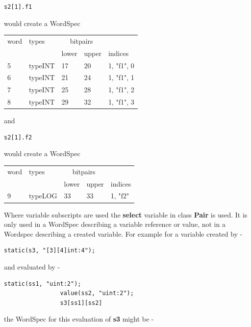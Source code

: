             \begin{lstlisting}[gobble=12, language=threepl]
                s2[1].f1
            \end{lstlisting}
            would create a WordSpec

            \begin{tabular}{| l || l || l l | l |}
            \hline
            word  & types    & \multicolumn{2}{c|}{bitpairs} & \\
                  &          & lower & upper & indices \\
            \hline \hline
             5    & typeINT  & 17    & 20    & 1, "f1", 0  \\ \hline
             6    & typeINT  & 21    & 24    & 1, "f1", 1  \\ \hline
             7    & typeINT  & 25    & 28    & 1, "f1", 2  \\ \hline
             8    & typeINT  & 29    & 32    & 1, "f1", 3  \\ \hline
            \end{tabular}

            and
            \begin{lstlisting}[gobble=12, language=threepl]
                s2[1].f2
            \end{lstlisting}
            would create a WordSpec

            \begin{tabular}{| l || l || l l | l |}
            \hline
            word  & types    & \multicolumn{2}{c|}{bitpairs} & \\
                  &          & lower & upper & indices \\
            \hline \hline
             9    & typeLOG  & 33    & 33    & 1, "f2"     \\ \hline
            \end{tabular}

            Where variable subscripts are used the {\bf select} variable
            in class {\bf Pair} is used. It is only used in a WordSpec
            describing a variable reference or value, not in a Wordspec
            describing a created variable. For example for a variable created
            by -
            \begin{lstlisting}[gobble=12, language=threepl]
             static(s3, "[3][4]int:4");
            \end{lstlisting}
            and evaluated by -
            \begin{lstlisting}[gobble=12, language=threepl]
                static(ss1, "uint:2");
                value(ss2, "uint:2");
                s3[ss1][ss2]
            \end{lstlisting}
            the WordSpec for this evaluation of {\bf s3} might be -

